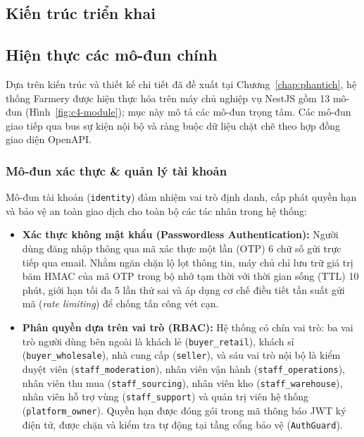 
\subsection{Kiến trúc triển khai}
\label{sec:trienkhai}

\subsection{Hiện thực các mô-đun chính}
\label{sec:hienthucmodule}

Dựa trên kiến trúc và thiết kế chi tiết đã đề xuất tại Chương~\ref{chap:phantich}, hệ thống Farmery được hiện thực hóa trên máy chủ nghiệp vụ NestJS gồm 13 mô-đun (Hình~\ref{fig:c4-module}); mục này mô tả các mô-đun trọng tâm. Các mô-đun giao tiếp qua bus sự kiện nội bộ và ràng buộc dữ liệu chặt chẽ theo hợp đồng giao diện OpenAPI.

\subsubsection*{Mô-đun xác thực \& quản lý tài khoản}
Mô-đun tài khoản (\texttt{identity}) đảm nhiệm vai trò định danh, cấp phát quyền hạn và bảo vệ an toàn giao dịch cho toàn bộ các tác nhân trong hệ thống:
\begin{itemize}
    \item \textbf{Xác thực không mật khẩu (Passwordless Authentication):} Người dùng đăng nhập thông qua mã xác thực một lần (OTP) 6 chữ số gửi trực tiếp qua email. Nhằm ngăn chặn lộ lọt thông tin, máy chủ chỉ lưu trữ giá trị băm HMAC của mã OTP trong bộ nhớ tạm thời với thời gian sống (TTL) 10 phút, giới hạn tối đa 5 lần thử sai và áp dụng cơ chế điều tiết tần suất gửi mã (\emph{rate limiting}) để chống tấn công vét cạn.
    \item \textbf{Phân quyền dựa trên vai trò (RBAC):} Hệ thống có chín vai trò: ba vai trò người dùng bên ngoài là khách lẻ (\texttt{buyer\_retail}), khách sỉ (\texttt{buyer\_wholesale}), nhà cung cấp (\texttt{seller}), và sáu vai trò nội bộ là kiểm duyệt viên (\texttt{staff\_moderation}), nhân viên vận hành (\texttt{staff\_operations}), nhân viên thu mua (\texttt{staff\_sourcing}), nhân viên kho (\texttt{staff\_warehouse}), nhân viên hỗ trợ vùng (\texttt{staff\_support}) và quản trị viên hệ thống (\texttt{platform\_owner}). Quyền hạn được đóng gói trong mã thông báo JWT ký điện tử, được chặn và kiểm tra tự động tại tầng cổng bảo vệ (\texttt{AuthGuard}).
\end{itemize}

